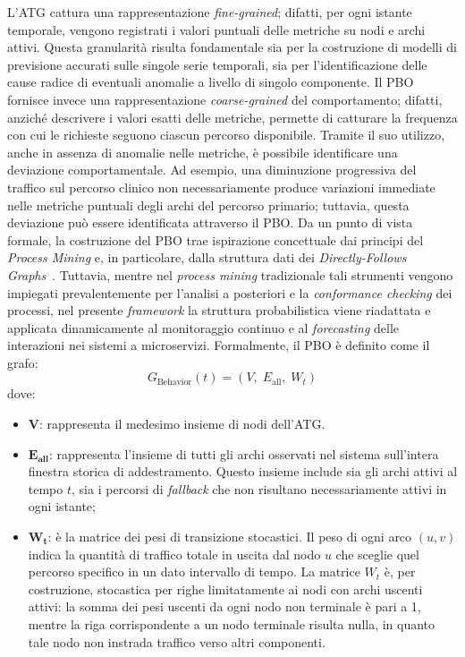 L'\gls{ATG} cattura una rappresentazione \emph{fine-grained}; difatti, per ogni istante temporale,
vengono registrati i valori puntuali delle metriche su nodi e archi attivi. Questa granularità
risulta fondamentale sia per la costruzione di modelli di previsione accurati sulle singole serie
temporali, sia per l'identificazione delle cause radice di eventuali anomalie a livello di singolo
componente. Il \gls{PBO} fornisce invece una rappresentazione \textit{coarse-grained} del
comportamento; difatti, anziché descrivere i valori esatti delle metriche, permette di catturare
la frequenza con cui le richieste seguono ciascun percorso disponibile. Tramite il suo utilizzo,
anche in assenza di anomalie nelle metriche, è possibile identificare una deviazione
comportamentale. Ad esempio, una diminuzione progressiva del traffico sul percorso clinico non
necessariamente produce variazioni immediate nelle metriche puntuali degli archi del percorso
primario; tuttavia, questa deviazione può essere identificata attraverso il \gls{PBO}. Da un punto
di vista formale, la costruzione del \gls{PBO} trae ispirazione concettuale dai principi del
\textit{Process Mining} e, in particolare, dalla struttura dati dei \textit{Directly-Follows
Graphs}~\cite{vanderaalst2016}. Tuttavia, mentre nel \textit{process mining}
tradizionale tali strumenti vengono impiegati prevalentemente per l'analisi a posteriori e la
\textit{conformance checking} dei processi, nel presente \textit{framework}
la struttura probabilistica viene riadattata e applicata dinamicamente al monitoraggio continuo e
al \textit{forecasting} delle interazioni nei sistemi a microservizi. Formalmente, il \gls{PBO}
è definito come il grafo:
\begin{equation}
\label{eq:pbo_def}
G_{\text{Behavior}}(t) = (V,\; E_{\text{all}},\; W_t)
\end{equation}
dove:

\begin{itemize}
  \item $\mathbf{V}$: rappresenta il medesimo insieme di nodi dell'\gls{ATG}.
  \item $\mathbf{E_{\text{all}}}$: rappresenta l'insieme di tutti gli archi osservati nel sistema
        sull'intera finestra storica di addestramento. Questo insieme include sia gli archi attivi
        al tempo $t$, sia i percorsi di \textit{fallback} che non risultano necessariamente attivi
        in ogni istante;
  \item $\mathbf{W_t}$: è la matrice dei pesi di transizione stocastici. Il peso di ogni arco
        $(u,v)$ indica la quantità di traffico totale in uscita dal nodo $u$ che sceglie quel
        percorso specifico in un dato intervallo di tempo. La matrice $W_t$ è, per costruzione,
        stocastica per righe limitatamente ai nodi con archi uscenti attivi: la somma dei pesi
        uscenti da ogni nodo non terminale è pari a 1, mentre la riga corrispondente a un nodo
        terminale risulta nulla, in quanto tale nodo non instrada traffico verso altri componenti.
\end{itemize}

